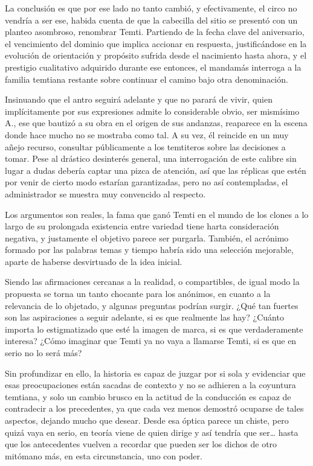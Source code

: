 \documentclass[
]{book}
\begin{document}
La conclusión es que por ese lado no tanto cambió, y efectivamente, el circo no vendría a ser ese, habida cuenta de que la cabecilla del sitio se presentó con un planteo asombroso, renombrar Temti. Partiendo de la fecha clave del aniversario, el vencimiento del dominio que implica accionar en respuesta, justificándose en la evolución de orientación y propósito sufrida desde el nacimiento hasta ahora, y el prestigio cualitativo adquirido durante ese entonces, el mandamás interroga a la familia temtiana restante sobre continuar el camino bajo otra denominación.

Insinuando que el antro seguirá adelante y que no parará de vivir, quien implícitamente por sus expresiones admite lo considerable obvio, ser mismísimo A., ese que bautizó a su obra en el origen de sus andanzas, reaparece en la escena donde hace mucho no se mostraba como tal. A su vez, él reincide en un muy añejo recurso, consultar públicamente a los temtiteros sobre las decisiones a tomar. Pese al drástico desinterés general, una interrogación de este calibre sin lugar a dudas debería captar una pizca de atención, así que las réplicas que estén por venir de cierto modo estarían garantizadas, pero no así contempladas, el administrador se muestra muy convencido al respecto.

Los argumentos son reales, la fama que ganó Temti en el mundo de los clones a lo largo de su prolongada existencia entre variedad tiene harta consideración negativa, y justamente el objetivo parece ser purgarla. También, el acrónimo formado por las palabras temas y tiempo habría sido una selección mejorable, aparte de haberse desvirtuado de la idea inicial.

Siendo las afirmaciones cercanas a la realidad, o compartibles, de igual modo la propuesta se torna un tanto chocante para los anónimos, en cuanto a la relevancia de lo objetado, y algunas preguntas podrían surgir. ¿Qué tan fuertes son las aspiraciones a seguir adelante, si es que realmente las hay? ¿Cuánto importa lo estigmatizado que esté la imagen de marca, si es que verdaderamente interesa? ¿Cómo imaginar que Temti ya no vaya a llamarse Temti, si es que en serio no lo será más?

Sin profundizar en ello, la historia es capaz de juzgar por si sola y evidenciar que esas preocupaciones están sacadas de contexto y no se adhieren a la coyuntura temtiana, y solo un cambio brusco en la actitud de la conducción es capaz de contradecir a los precedentes, ya que cada vez menos demostró ocuparse de tales aspectos, dejando mucho que desear. Desde esa óptica parece un chiste, pero quizá vaya en serio, en teoría viene de quien dirige y así tendría que ser\ldots{} hasta que los antecedentes vuelven a recordar que pueden ser los dichos de otro mitómano más, en esta circunstancia, uno con poder.
\end{document}
